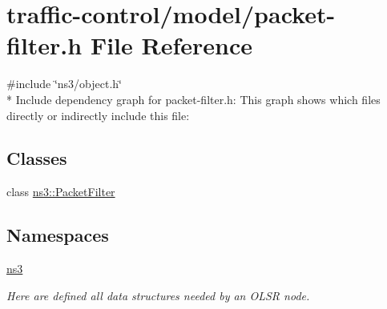 \hypertarget{packet-filter_8h}{}\section{traffic-\/control/model/packet-\/filter.h File Reference}
\label{packet-filter_8h}
{\ttfamily \#include \char`\"{}ns3/object.\+h\char`\"{}}\\*
Include dependency graph for packet-\/filter.h\+:
This graph shows which files directly or indirectly include this file\+:
\subsection*{Classes}
\begin{DoxyCompactItemize}
\item 
class \hyperlink{classns3_1_1PacketFilter}{ns3\+::\+Packet\+Filter}
\end{DoxyCompactItemize}
\subsection*{Namespaces}
\begin{DoxyCompactItemize}
\item 
 \hyperlink{namespacens3}{ns3}
\begin{DoxyCompactList}\small\item\em Here are defined all data structures needed by an O\+L\+SR node. \end{DoxyCompactList}\end{DoxyCompactItemize}
